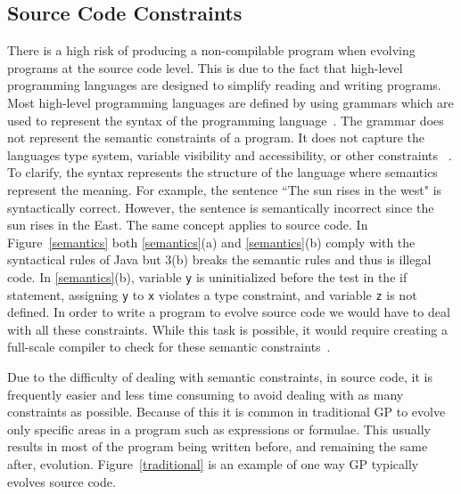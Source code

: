 \documentclass{sig-alternate}
\begin{document}
\subsection{Source Code Constraints}
There is a high risk of producing a non-compilable program when evolving programs at the source code level. This is due to the fact that high-level programming languages are designed to simplify reading and writing programs. Most high-level programming languages are defined by using grammars which are used to represent the syntax of the programming language~\cite{Oracle:2013,Assembly:2010}. The grammar does not represent the semantic constraints of a program. It does not capture the languages type system, variable visibility and accessibility, or other constraints ~\cite{FINCH:2011}. To clarify, the syntax represents the structure of the language where semantics represent the meaning.  For example, the sentence ``The sun rises in the west" is syntactically correct. However, the sentence is semantically incorrect since the sun rises in the East. The same concept applies to source code. In Figure~\ref{semantics} both \ref{semantics}(a) and \ref{semantics}(b) comply with the syntactical rules of Java but 3(b) breaks the semantic rules and thus is illegal code. In \ref{semantics}(b), variable \texttt{y} is uninitialized before the test in the if statement, assigning \texttt{y} to \texttt{x} violates a type constraint, and variable \texttt{z} is not defined. In order to write a program to evolve source code we would have to deal with all these constraints. While this task is possible, it would require creating a full-scale compiler to check for these semantic constraints~\cite{FINCH:2011}.\par

Due to the difficulty of dealing with semantic constraints, in source code, it is frequently easier and less time consuming to avoid dealing with as many constraints as possible. Because of this it is common in traditional GP to evolve only specific areas in a program such as expressions or formulae. This usually results in most of the program being written before, and remaining the same after, evolution. Figure~\ref{traditional} is an example of one way GP typically evolves source code.\par
\end{document}
